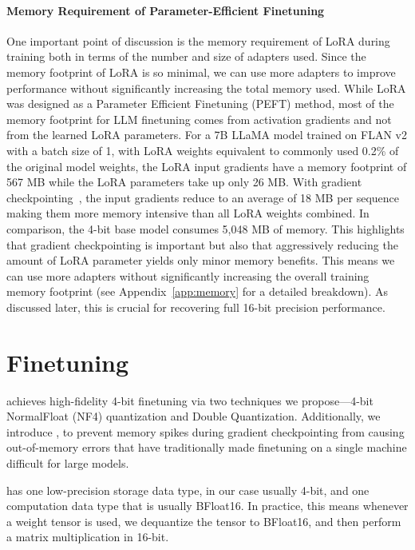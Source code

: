\paragraph{Memory Requirement of Parameter-Efficient Finetuning}
One important point of discussion is the memory requirement of LoRA during training both in terms of the number and size of adapters used. Since the memory footprint of LoRA is so minimal, we can use more adapters to improve performance without significantly increasing the total memory used.
While LoRA was designed as a Parameter Efficient Finetuning (PEFT) method, most of the memory footprint for LLM finetuning comes from activation gradients and not from the learned LoRA parameters. 
For a 7B LLaMA model trained on FLAN v2 with a batch size of 1, with LoRA weights equivalent to commonly used 0.2\% of the original model weights\citep{hu2021lora,liu2022few}, the LoRA input gradients have a memory footprint of 567 MB while the LoRA parameters take up only 26 MB. With gradient checkpointing~\citep{chen2016training}, the input gradients reduce to an average of 18 MB per sequence making them more memory intensive than all LoRA weights combined. In comparison, the 4-bit base model consumes 5,048 MB of memory.
This highlights that gradient checkpointing is important but also that aggressively reducing the amount of LoRA parameter yields only minor memory benefits. This means we can use more adapters without significantly increasing the overall training memory footprint (see Appendix~\ref{app:memory} for a detailed breakdown). 
As discussed later, this is crucial for recovering full 16-bit precision performance.

\section{\method Finetuning}

\method achieves high-fidelity 4-bit finetuning via two techniques we propose—4-bit NormalFloat (NF4) quantization and Double Quantization. Additionally, we introduce \Pagedoptim, to prevent memory spikes during gradient checkpointing from causing out-of-memory errors that have traditionally made finetuning on a single machine difficult for large models.

\method has one low-precision storage data type, in our case usually 4-bit, and one computation data type that is usually BFloat16. In practice, this means whenever a \method weight tensor is used, we dequantize the tensor to BFloat16, and then perform a matrix multiplication in 16-bit. 

